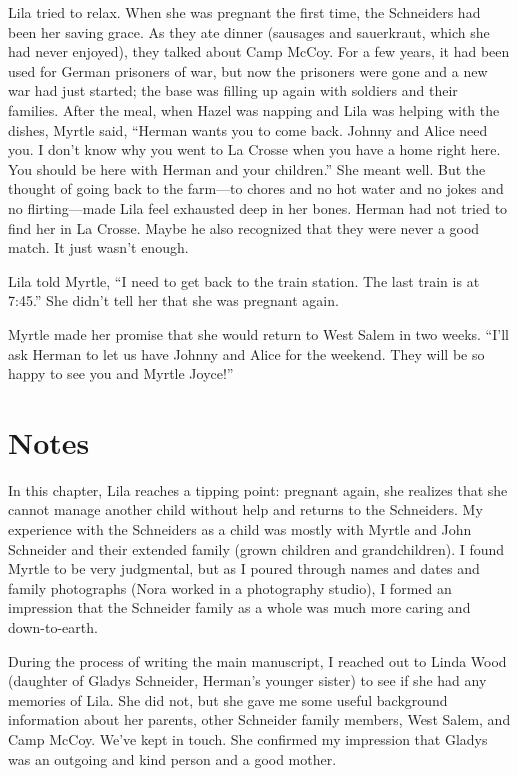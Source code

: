 \documentclass[
  letterpaper,
]{book}
\begin{document}
Lila tried to relax. When she was pregnant the first time, the
Schneiders had been her saving grace. As they ate dinner (sausages and
sauerkraut, which she had never enjoyed), they talked about Camp McCoy.
For a few years, it had been used for German prisoners of war, but now
the prisoners were gone and a new war had just started; the base was
filling up again with soldiers and their families. After the meal, when
Hazel was napping and Lila was helping with the dishes, Myrtle said,
``Herman wants you to come back. Johnny and Alice need you. I don't know
why you went to La Crosse when you have a home right here. You should be
here with Herman and your children.'' She meant well. But the thought of
going back to the farm---to chores and no hot water and no jokes and no
flirting---made Lila feel exhausted deep in her bones. Herman had not
tried to find her in La Crosse. Maybe he also recognized that they were
never a good match. It just wasn't enough.

Lila told Myrtle, ``I need to get back to the train station. The last
train is at 7:45.'' She didn't tell her that she was pregnant again.

Myrtle made her promise that she would return to West Salem in two
weeks. ``I'll ask Herman to let us have Johnny and Alice for the
weekend. They will be so happy to see you and Myrtle Joyce!''

\section{Notes}\label{notes-51}

In this chapter, Lila reaches a tipping point: pregnant again, she
realizes that she cannot manage another child without help and returns
to the Schneiders. My experience with the Schneiders as a child was
mostly with Myrtle and John Schneider and their extended family (grown
children and grandchildren). I found Myrtle to be very judgmental, but
as I poured through names and dates and family photographs (Nora worked
in a photography studio), I formed an impression that the Schneider
family as a whole was much more caring and down-to-earth.

During the process of writing the main manuscript, I reached out to
Linda Wood (daughter of Gladys Schneider, Herman's younger sister) to
see if she had any memories of Lila. She did not, but she gave me some
useful background information about her parents, other Schneider family
members, West Salem, and Camp McCoy. We've kept in touch. She confirmed
my impression that Gladys was an outgoing and kind person and a good
mother.
\end{document}
